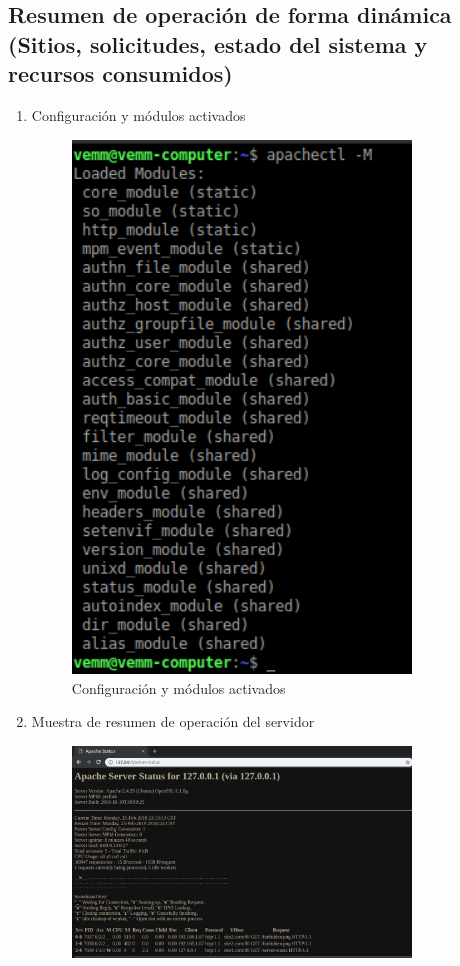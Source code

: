\subsection{Resumen de operación de forma dinámica (Sitios, solicitudes, estado del sistema y recursos consumidos)}
	\begin{enumerate}
		\item Configuración y módulos activados
			\begin{figure}[htbp]
				\centering
				\includegraphics[width=9cm]{./img/lista/17.png}
				\caption[Configuración y módulos activados]{Configuración y módulos activados}
				\label{fig:17}
			\end{figure}
		\item Muestra de resumen de operación del servidor
		\begin{figure}[htbp]
			\centering
			\includegraphics[width=9cm]{./img/lista/18.png}

\end{figure}
\end{enumerate}
